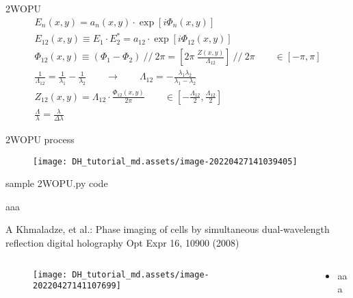 \documentclass[t, aspectratio=169]{beamer}
\begin{document}
\begin{frame}{2WOPU}
	\begin{gather*}
E_n(x,y) = a_n(x,y)\cdot\exp[i\Phi_n(x,y)] \\
E_{12}(x,y) \equiv E_1\cdot E_2^* = a_{12}\cdot\exp[i\Phi_{12}(x,y)]\\
\Phi_{12}(x,y) \equiv (\Phi_1 - \Phi_2) \ //\ 2\pi = \left[ 2\pi\ \frac{Z(x,y)}{\Lambda_{12}} \right]\ //\ 2\pi \qquad \in [-\pi,\pi] \\
\frac{1}{\Lambda_{12}} = \frac{1}{\lambda_1} - \frac{1}{\lambda_2} \qquad\rightarrow\qquad \Lambda_{12} = -\frac{\lambda_1 \lambda_2}{\lambda_1 - \lambda_2} \\
Z_{12}(x,y) = \Lambda_{12}\cdot\frac{\Phi_{12}(x,y)}{2\pi} \qquad \in\left[-\frac{\Lambda_{12}}{2}, \frac{\Lambda_{12}}{2} \right] \\
\frac{\Lambda}{\lambda} = \frac{\lambda}{\Delta\lambda}
	\end{gather*}
\end{frame}


\begin{frame}{2WOPU process}
	\begin{figure}
		\texttt{[image: DH\_tutorial\_md.assets/image-20220427141039405]}
	\end{figure}
\end{frame}


\begin{frame}[fragile]{sample 2WOPU.py code}
	\begin{semiverbatim}
aaa
	\end{semiverbatim}
\end{frame}


\begin{frame}{A Khmaladze, et al.: Phase imaging of cells by simultaneous dual-wavelength reflection digital holography}
	\vspace{-3 mm}
	\small Opt Expr 16, 10900 (2008)
	\begin{columns}
		\begin{column}{.6\textwidth}
			\begin{figure}
				\texttt{[image: DH\_tutorial\_md.assets/image-20220427141107699]}
			\end{figure}
		\end{column}
		\begin{column}{.4\textwidth}
			\begin{itemize}
				\item aaa
			\end{itemize}
		\end{column}
	\end{columns}
\end{frame}
\end{document}
